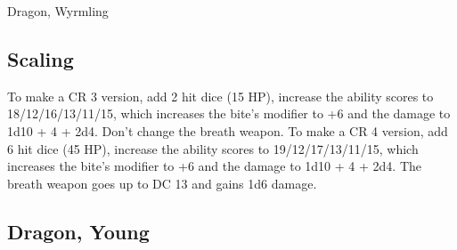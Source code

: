 \begin{DndMonster}[float=*b,width\textwidth + 8pt]{Dragon, Wyrmling}
\begin{multicols}{2}
\subsection{Scaling}
To make a CR 3 version, add 2 hit dice (15 HP), increase the ability scores to 18/12/16/13/11/15, which increases the bite's modifier to +6 and the damage to 1d10 + 4 + 2d4. Don't change the breath weapon.
To make a CR 4 version, add 6 hit dice (45 HP), increase the ability scores to 19/12/17/13/11/15, which increases the bite's modifier to +6 and the damage to 1d10 + 4 + 2d4. The breath weapon goes up to DC 13 and gains 1d6 damage.
\end{multicols}
\end{DndMonster}
\subsection{Dragon, Young}
